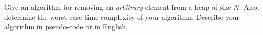 Give an algorithm for removing an {\em arbitrary} element from a heap
of size $N$.  Also, determine the worst case time complexity of your algorithm.
Describe your algorithm in pseudo-code or in English.
